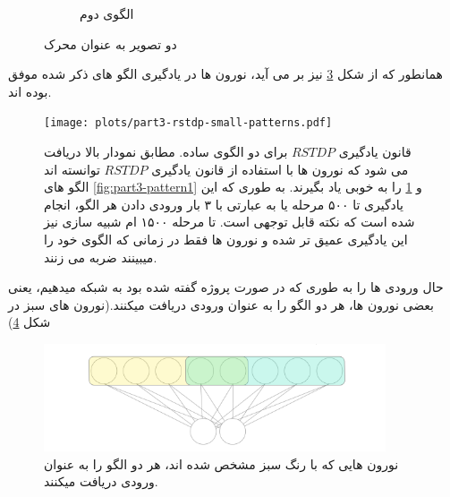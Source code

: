 \begin{figure}[!ht]
\begin{subfigure}[b]{0.35\textwidth}
                \caption{الگوی دوم}
                \label{fig:part3-pattern2}
            \end{subfigure}
            \caption{دو تصویر به عنوان محرک}
            \label{fig:part3-patterns}
        \end{figure}
        همانطور که از شکل
        \ref{fig:part3-rstdp-small-patterns} 
        نیز بر می آید، نورون ها در یادگیری الگو های ذکر شده موفق بوده اند.

        \begin{figure}[!ht]
            \centering
            \captionsetup{width=.9\linewidth}
            \texttt{[image: plots/part3-rstdp-small-patterns.pdf]} 
            \caption{قانون یادگیری 
            $RSTDP$ برای دو الگوی ساده. مطابق نمودار بالا دریافت می شود که نورون ها با استفاده از قانون یادگیری 
            $RSTDP$ 
            توانسته اند الگو های 
            \ref{fig:part3-pattern1}
            و 
            \ref{fig:part3-pattern2} 
            را به خوبی یاد بگیرند. به طوری که این یادگیری تا ۵۰۰ مرحله یا به عبارتی با ۳ بار ورودی دادن هر الگو، انجام شده است که نکته قابل توجهی است. تا مرحله ۱۵۰۰ ام شبیه سازی نیز این یادگیری عمیق تر شده و نورون ها  فقط در زمانی که الگوی خود را میبینند ضربه می زنند.
            }
            \label{fig:part3-rstdp-small-patterns}
        \end{figure}
        حال ورودی ها را به طوری که در صورت پروژه گفته شده بود به شبکه میدهیم، یعنی بعضی نورون ها، هر دو الگو را به عنوان ورودی دریافت میکنند.(نورون های سبز در شکل
        \ref{fig:part3-input-overlap})

        \begin{figure}[!ht]
            \centering
            \captionsetup{width=.9\linewidth}
            \includegraphics[width=0.9\textwidth]{images/input-overlap.png} 
            \caption{نورون هایی که با رنگ سبز مشخص شده اند، هر دو الگو را به عنوان ورودی دریافت میکنند.
            }
            \label{fig:part3-input-overlap}
        \end{figure}


